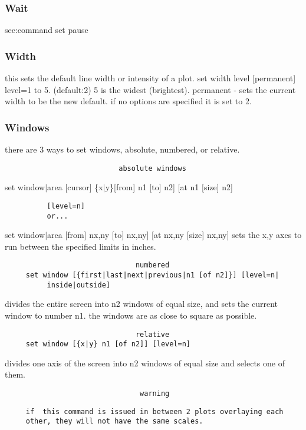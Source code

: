 \subsubsection{Wait}
see:command set pause 
\subsubsection{Width}
this sets the default line width or intensity of a plot.  
set width level [permanent] 
level=1 to 5.  (default:2) 5 is the widest (brightest).  
permanent - sets the current width to be the new default.  
if no options are specified it is set to 2.  
\subsubsection{Windows}
there are 3 ways to set windows, absolute, numbered, or relative.  

\begin{verbatim}
                           absolute windows
\end{verbatim}
set window$|$area [cursor] \{x$|$y\}[from] n1 [to] n2] [at n1 [size] n2]
\begin{verbatim}
          [level=n] 
          or...  
\end{verbatim}
set window$|$area [from] nx,ny [to] nx,ny] [at nx,ny [size] nx,ny] 
sets the x,y axes to run between the specified limits in inches.  

\begin{verbatim}
                               numbered
     set window [{first|last|next|previous|n1 [of n2]}] [level=n|
          inside|outside] 
\end{verbatim}
divides  the  entire screen into n2 windows of equal size, and sets the
current window to number n1.  the windows are as  close  to  square  as
possible.  

\begin{verbatim}
                               relative
     set window [{x|y} n1 [of n2]] [level=n] 
\end{verbatim}
divides  one  axis  of  the  screen  into  n2 windows of equal size and
selects one of them.  


\begin{verbatim}
                                warning
\end{verbatim}

\begin{verbatim}
     if  this command is issued in between 2 plots overlaying each
     other, they will not have the same scales.  
\end{verbatim}


